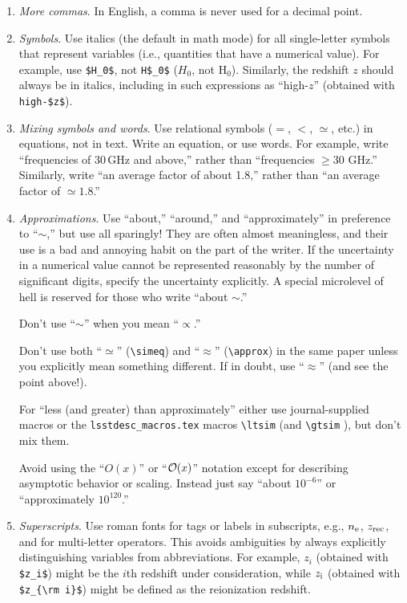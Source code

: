 \documentclass[letterpaper,11pt]{article}
\begin{document}
\begin{enumerate}
\item {\it More commas\/}. In English, a comma is never used for a decimal
point. 

\item {\it Symbols\/}. Use italics (the default in math mode)  for all
single-letter symbols that represent variables (i.e., quantities that have a
numerical value).  For example, use {\tt \$H\_0\$}, not {\tt H\$\_0\$}
($H_0$, not H$_0$).  Similarly, the redshift $z$ should always be in italics,
including in such expressions as ``high-$z$'' (obtained with \verb|high-$z$|).  

\item {\it Mixing symbols and words\/}.   Use relational symbols ($=$,  $<$, $\simeq$, etc.) in equations, not in
text.   Write an equation, or use words.  For example, write ``frequencies of
30\,GHz and above,'' rather than ``frequencies $\ge 30$ GHz.''  Similarly,
write ``an average factor of about 1.8,'' rather than ``an average factor of
$\simeq 1.8$.''  %

\item {\it Approximations\/}.
Use ``about,'' ``around,'' and ``approximately'' in preference to
``$\sim$,'' but use all sparingly!  They are often almost meaningless, and
their use is a bad and annoying habit on the part of the writer.  If the
uncertainty in a numerical value cannot be represented reasonably by the
number of significant digits, specify the uncertainty explicitly.  A special
microlevel of hell is reserved for those who write ``about $\sim$.''

Don't use ``$\sim$''  when you mean ``$\propto$.''

Don't use both ``$\simeq$'' (\verb|\simeq|) and ``$\approx$'' (\verb|\approx|) in
the same paper unless you explicitly mean something different.  If in doubt,
use ``$\approx$'' (and see the point above!).

For ``less (and greater) than approximately'' either use journal-supplied macros or the {\tt lsstdesc\_macros.tex} macros
\verb|\ltsim| (and \verb|\gtsim| \FIXME{[to be added]}), but don't mix them.

Avoid using the ``$O(x)$'' or ``${\cal O}(x)$'' notation except for describing
asymptotic behavior or scaling.  Instead just say ``about $10^{-6}$'' or
``approximately $10^{120}$.''

\item {\it Superscripts\/}.
Use roman fonts for tags or labels in subscripts, e.g., $n_{\rm e}$,
$z_{\rm rec}$, and for multi-letter operators.  This avoids ambiguities by
always explicitly distinguishing variables from abbreviations.  For example,
$z_i$ (obtained with \verb|$z_i$|) might be the $i$th redshift under consideration,
while $z_{\rm i}$ (obtained with \verb|$z_{\rm i}$|) might be defined as the
reionization redshift.


\end{enumerate}
\end{document}
